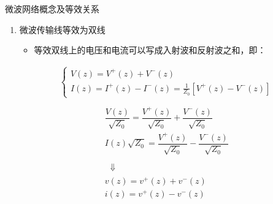 \begin{frame}{微波网络概念及等效关系}
    \begin{enumerate}
        \item 微波传输线等效为双线
              \begin{itemize}
                  \item 等效双线上的电压和电流可以写成入射波和反射波之和，即：          
              \end{itemize}
              \begin{gather*}
                \begin{cases}
                    V(z)=V^{+}(z)+V^{-}(z) \\
                    I(z)=I^{+}(z)-I^{-}(z)=\frac{1}{Z_0}[V^{+}(z)-V^{-}(z)]
                \end{cases}
            \end{gather*}
            \begin{gather*}                                                                                                              \\
                \begin{matrix*}
                    \dfrac{V(z)}{\sqrt{Z_0}}=\dfrac{V^{+}(z)}{\sqrt{Z_0}}+\dfrac{V^{-}(z)}{\sqrt{Z_0}}\\
                    I(z)\sqrt{Z_0}=\dfrac{V^{+}(z)}{\sqrt{Z_0}}-\dfrac{V^{-}(z)}{\sqrt{Z_0}}\\
                \end{matrix*} \\
                \quad\Downarrow\quad                                                                                                                                            \\
                \begin{matrix*}
                    v(z)=v^{+}(z)+v^{-}(z)\\
                    i(z)=v^{+}(z)-v^{-}(z)\\
                \end{matrix*}
            \end{gather*}
    \end{enumerate}
\end{frame}

